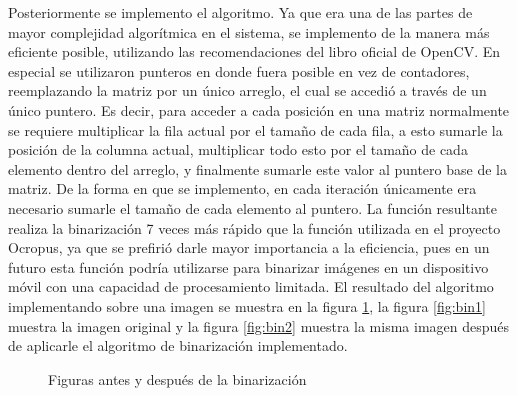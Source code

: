 \documentclass[a4paper, 11pt, oneside]{report}
\begin{document}
Posteriormente se implemento el algoritmo. Ya que era una de las partes de mayor complejidad algorítmica en el sistema, se implemento de la manera más eficiente posible, utilizando las recomendaciones del libro oficial de OpenCV. En especial se utilizaron punteros en donde fuera posible en vez de contadores, reemplazando la matriz por un único arreglo, el cual se accedió a través de un único puntero. Es decir, para acceder a cada posición en una matriz normalmente se requiere multiplicar la fila actual por el tamaño de cada fila, a esto sumarle la posición de la columna actual, multiplicar todo esto por el tamaño de cada elemento dentro del arreglo, y finalmente sumarle este valor al puntero base de la matriz. De la forma en que se implemento, en cada iteración únicamente era necesario sumarle el tamaño de cada elemento al puntero. La función resultante realiza la binarización 7 veces más rápido que la función utilizada en el proyecto Ocropus, ya que se prefirió darle mayor importancia a la eficiencia, pues en un futuro esta función podría utilizarse para binarizar imágenes en un dispositivo móvil con una capacidad de procesamiento limitada. El resultado del algoritmo implementando sobre una imagen se muestra en la figura \ref{fig:binarization}, la figura \ref{fig:bin1} muestra la imagen original y la figura \ref{fig:bin2} muestra la misma imagen después de aplicarle el algoritmo de binarización implementado.

	\begin{figure}
	\centering
	\caption{Figuras antes y después de la binarización}
	\label{fig:binarization}
	\end{figure}
\end{document}
